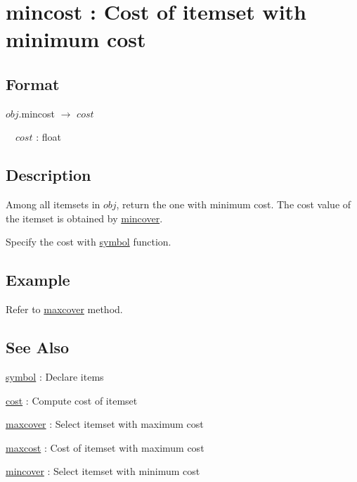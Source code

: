 
\section{mincost : Cost of itemset with minimum cost\label{sect:mincost}}
\subsection*{Format}
$obj$.mincost $\rightarrow$ $cost$

~~$cost$ : float

\subsection*{Description}
Among all itemsets in $obj$, return the one with minimum cost.  
The cost value of the itemset is obtained by \hyperref[sect:mincover]{mincover}. 

Specify the cost with \hyperref[sect:symbol]{symbol} function. 

\subsection*{Example}

Refer to \hyperref[sect:maxcover]{maxcover} method. 

\subsection*{See Also}
\hyperref[sect:symbol]{symbol} : Declare items

\hyperref[sect:cost]{cost} : Compute cost of itemset 

\hyperref[sect:maxcover]{maxcover} : Select itemset with maximum cost 

\hyperref[sect:maxcost]{maxcost} : Cost of itemset with maximum cost

\hyperref[sect:mincover]{mincover} : Select itemset with minimum cost 


